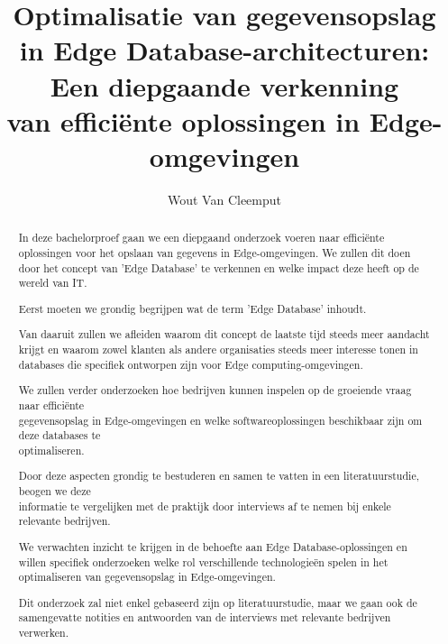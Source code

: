 \documentclass{hogent-article}
\title{Optimalisatie van gegevensopslag in Edge Database-architecturen: Een diepgaande verkenning \\ van efficiënte oplossingen in Edge-omgevingen}
\author{Wout Van Cleemput}
\begin{document}
\begin{abstract}
 In deze bachelorproef gaan we een diepgaand onderzoek voeren naar efficiënte oplossingen voor het opslaan 
 van gegevens in Edge-omgevingen.
  We zullen dit doen door het concept van 'Edge Database' te verkennen
  en welke impact deze heeft op de wereld van IT.

Eerst moeten we grondig begrijpen wat de term 'Edge Database' inhoudt.

Van daaruit zullen we afleiden waarom dit concept de laatste tijd steeds meer aandacht krijgt
  en waarom zowel klanten als andere organisaties steeds meer interesse tonen in databases die specifiek ontworpen zijn voor
    Edge computing-omgevingen.
 
We zullen verder onderzoeken hoe bedrijven kunnen inspelen op de groeiende vraag naar efficiënte \\ gegevensopslag in Edge-omgevingen
  en welke softwareoplossingen beschikbaar zijn om deze databases te \\ optimaliseren.

Door deze aspecten grondig te bestuderen en samen te vatten in een literatuurstudie,
 beogen we deze \\ informatie te vergelijken met de praktijk door interviews af te nemen bij enkele relevante bedrijven.

We verwachten inzicht te krijgen in de behoefte aan Edge Database-oplossingen en willen specifiek onderzoeken welke rol
 verschillende technologieën spelen in het optimaliseren van gegevensopslag in Edge-omgevingen.

 Dit onderzoek zal niet enkel gebaseerd zijn op literatuurstudie, maar we gaan ook de samengevatte notities
  en antwoorden van de interviews met relevante bedrijven verwerken.


\end{abstract}

\tableofcontents



\printbibliography[heading=bibintoc]
\end{document}
